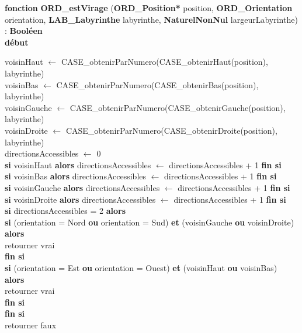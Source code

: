 \noindent\textbf{fonction} \textbf{ORD\_estVirage} (\textbf{ORD\_Position*} position, \textbf{ORD\_Orientation} orientation, \textbf{LAB\_Labyrinthe} labyrinthe, \textbf{NaturelNonNul} largeurLabyrinthe) : \textbf{Booléen}\\
\textbf{début}
\begin{flushleft}
    \hspace*{1cm}voisinHaut $\gets$ CASE\_obtenirParNumero(CASE\_obtenirHaut(position), labyrinthe)\\
    \hspace*{1cm}voisinBas $\gets$ CASE\_obtenirParNumero(CASE\_obtenirBas(position), labyrinthe)\\
    \hspace*{1cm}voisinGauche $\gets$ CASE\_obtenirParNumero(CASE\_obtenirGauche(position), labyrinthe)\\
    \hspace*{1cm}voisinDroite $\gets$ CASE\_obtenirParNumero(CASE\_obtenirDroite(position), labyrinthe)\\
    \hspace*{1cm}directionsAccessibles $\gets$ 0\\
    \hspace*{1cm}\textbf{si} voisinHaut \textbf{alors} directionsAccessibles $\gets$ directionsAccessibles + 1 \textbf{fin si}\\
    \hspace*{1cm}\textbf{si} voisinBas \textbf{alors} directionsAccessibles $\gets$ directionsAccessibles + 1 \textbf{fin si}\\
    \hspace*{1cm}\textbf{si} voisinGauche \textbf{alors} directionsAccessibles $\gets$ directionsAccessibles + 1 \textbf{fin si}\\
    \hspace*{1cm}\textbf{si} voisinDroite \textbf{alors} directionsAccessibles $\gets$ directionsAccessibles + 1 \textbf{fin si}\\
    \hspace*{1cm}\textbf{si} directionsAccessibles = 2 \textbf{alors}\\
    \hspace*{2cm}\textbf{si} (orientation = Nord \textbf{ou} orientation = Sud) \textbf{et} (voisinGauche \textbf{ou} voisinDroite) \textbf{alors}\\
    \hspace*{3cm}retourner vrai\\
    \hspace*{2cm}\textbf{fin si}\\
    \hspace*{2cm}\textbf{si} (orientation = Est \textbf{ou} orientation = Ouest) \textbf{et} (voisinHaut \textbf{ou} voisinBas) \textbf{alors}\\
    \hspace*{3cm}retourner vrai\\
    \hspace*{2cm}\textbf{fin si}\\
    \hspace*{1cm}\textbf{fin si}\\
    \hspace*{1cm}retourner faux
\end{flushleft}
